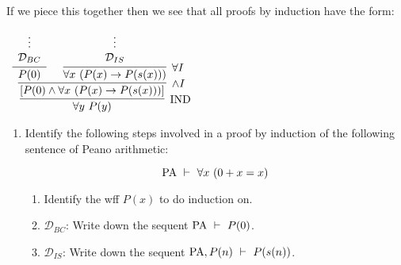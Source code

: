 \documentclass[11pt]{report}
\begin{document}
	If we piece this together then we see that all proofs by induction have the form: 

	\begin{mdframed}
		\begin{center}
			$\begin{array}{c}
				\infer[\IND]{\forall y \ P(y)}
					{\infer[\land I]{[P(0) \land \forall x \ (P(x) \to P(s(x)))]}
						{\infer[]{P(0)}{\begin{array}{c} \vdots \\ \mathcal{D}_{BC}\end{array}}
						&
						\infer[\forall I]{\forall x \ (P(x) \to P(s(x)))}
							{\begin{array}{c} \vdots \\ \mathcal{D}_{IS}\end{array}}}}
			\end{array}$
		\end{center}
	\end{mdframed}

	\begin{enumerate}
		\item Identify the following steps involved in a proof by induction of the following sentence of Peano arithmetic: 
		
		$$\PA \ \vdash \ \forall x \ (0+x=x) $$

			\begin{enumerate}
				\item Identify the wff $P(x)$ to do induction on. 
				\item $\mathcal{D}_{BC}$: Write down the sequent $\PA \ \vdash \ P(0)$.
				\item $\mathcal{D}_{IS}$: Write down the sequent $\PA, P(n) \ \vdash \ P(s(n))$.	
			\end{enumerate}
	\end{enumerate}
\end{document}
